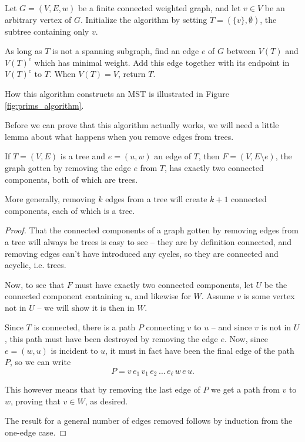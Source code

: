 \documentclass[nobib]{tufte-handout}
\begin{document}
\begin{definition}
  Let $G = (V,E,w)$ be a finite connected weighted graph, and let $v \in V$ be an arbitrary vertex of $G$. Initialize the algorithm by setting $T = (\{v\}, \emptyset)$, the subtree containing only $v$.

  As long as $T$ is not a spanning subgraph, find an edge $e$ of $G$ between $V(T)$ and $V(T)^c$ which has minimal weight. Add this edge together with its endpoint in $V(T)^c$ to $T$. When $V(T) = V$, return $T$.

  How this algorithm constructs an MST is illustrated in Figure \ref{fig:prims_algorithm}.
\end{definition}

Before we can prove that this algorithm actually works, we will need a little lemma about what happens when you remove edges from trees.

\begin{lemma} \label{lemma:removing_edges_from_trees}
  If $T = (V, E)$ is a tree and $e = (u, w)$ an edge of $T$, then $F = (V, E \setminus e)$, the graph gotten by removing the edge $e$ from $T$, has exactly two connected components, both of which are trees.

  More generally, removing $k$ edges from a tree will create $k+1$ connected components, each of which is a tree.
  
  \begin{proof}
    That the connected components of a graph gotten by removing edges from a tree will always be trees is easy to see -- they are by definition connected, and removing edges can't have introduced any cycles, so they are connected and acyclic, i.e. trees.

    Now, to see that $F$ must have exactly two connected components, let $U$ be the connected component containing $u$, and likewise for $W$. Assume $v$ is some vertex not in $U$ -- we will show it is then in $W$.

    Since $T$ is connected, there is a path $P$ connecting $v$ to $u$ -- and since $v$ is not in $U$, this path must have been destroyed by removing the edge $e$. Now, since $e = (w, u)$ is incident to $u$, it must in fact have been the final edge of the path $P$, so we can write
    $$P = v\, e_1\, v_1\, e_2\, \ldots\, e_\ell\, w\, e\, u.$$
    
    This however means that by removing the last edge of $P$ we get a path from $v$ to $w$, proving that $v \in W$, as desired.

    The result for a general number of edges removed follows by induction from the one-edge case.
  \end{proof}
\end{lemma}
\end{document}
